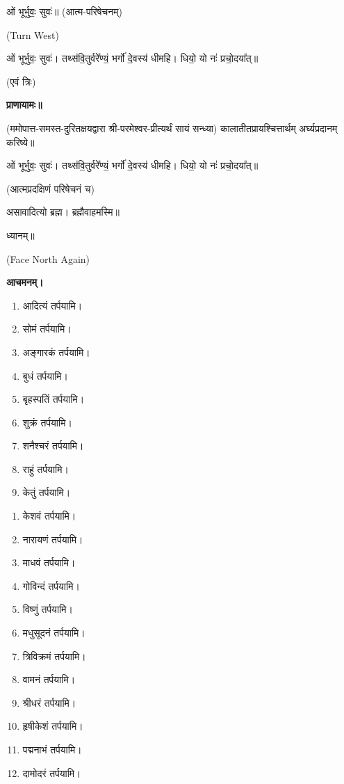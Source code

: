 ओं भूर्भुवः॒ सुवः॑॥ (आत्म-परिषेचनम्)


{\scriptsize (Turn West)}

ओं भूर्भुवः॒ सुवः॑। तथ्स॑वि॒तुर्वरे᳚ण्यं॒ भर्गो॑ दे॒वस्य॑ धीमहि। धियो॒ यो नः॑ प्रचो॒दया᳚त्॥

\hfill{(एवं त्रिः)}


\textbf{प्राणायामः॥}

(ममोपात्त-समस्त-दुरितक्षयद्वारा श्री-परमेश्वर-प्रीत्यर्थं सायं सन्ध्या)
कालातीतप्रायश्चित्तार्थम् अर्घ्यप्रदानम् करिष्ये॥

ओं भूर्भुवः॒ सुवः॑। तथ्स॑वि॒तुर्वरे᳚ण्यं॒ भर्गो॑ दे॒वस्य॑ धीमहि। धियो॒ यो नः॑ प्रचो॒दया᳚त्॥

(आत्मप्रदक्षिणं परिषेचनं च)


असावादित्यो ब्रह्म। ब्रह्मैवाहमस्मि॥

ध्यानम्॥

{\scriptsize (Face North Again)}

\textbf{आचमनम्।}



\begin{enumerate}
 \item आदित्यं तर्पयामि।
 \item सोमं तर्पयामि।
 \item अङ्गारकं तर्पयामि।
 \item बुधं तर्पयामि।
 \item बृहस्पतिं तर्पयामि।
 \item शुक्रं तर्पयामि।
 \item शनैश्चरं तर्पयामि।
 \item राहुं तर्पयामि।
 \item केतुं तर्पयामि।
\end{enumerate}


\begin{enumerate}
\item केशवं तर्पयामि।
\item नारायणं तर्पयामि।
\item माधवं तर्पयामि।
\item गोविन्दं तर्पयामि।
\item विष्णुं तर्पयामि।
\item मधुसूदनं तर्पयामि।
\item त्रिविक्रमं तर्पयामि।
\item वामनं तर्पयामि।
\item श्रीधरं तर्पयामि।
\item हृषीकेशं तर्पयामि।
\item पद्मनाभं तर्पयामि।
\item दामोदरं तर्पयामि।
\end{enumerate}

